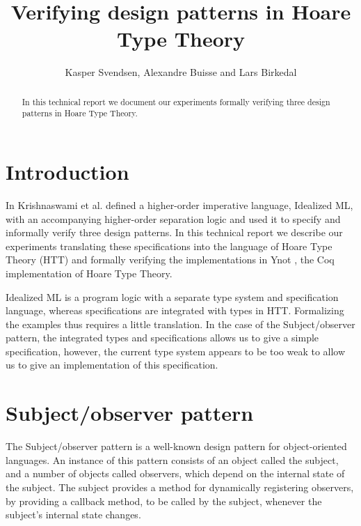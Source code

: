 \documentclass[a4paper,english]{article}
\title{Verifying design patterns in Hoare Type Theory}
\author{Kasper Svendsen, Alexandre Buisse and Lars Birkedal}
\begin{document}
\makefront 
\maketitle

\begin{abstract}
In this technical report we document our experiments formally verifying three
design patterns in Hoare Type Theory.
\end{abstract}

\section{Introduction}

In \cite{patterns, subobj} Krishnaswami et al. defined a higher-order imperative
language, Idealized ML, with an accompanying higher-order separation logic and
used it to specify and informally verify three design patterns. In this
technical report we describe our experiments translating these specifications
into the language of Hoare Type Theory (HTT) and formally verifying the
implementations in Ynot \cite{ynot-conf}, the Coq implementation of Hoare
Type Theory.

Idealized ML is a program logic with a separate type system and specification
language, whereas specifications are integrated with types in HTT. Formalizing
the examples thus requires a little translation. In the case of the
Subject/observer pattern, the integrated types and specifications allows us to
give a simple specification, however, the current type system appears to be
too weak to allow us to give an implementation of this specification. 

\section{Subject/observer pattern}

The Subject/observer pattern is a well-known design pattern for object-oriented
languages. An instance of this pattern consists of an object called the
subject, and a number of objects called observers, which depend on the internal
state of the subject. The subject provides a method for dynamically registering
observers, by providing a callback method, to be called by the subject,
whenever the subject's internal state changes.
\end{document}
